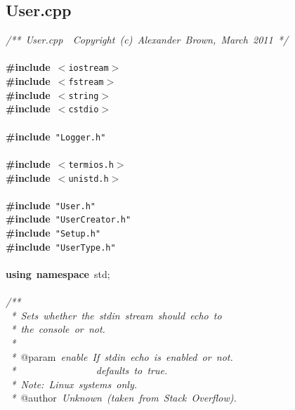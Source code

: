 \clearpage
\normalsize
\rmfamily
\subsection{User.cpp}
\scriptsize
\sffamily
\noindent
\mbox{}\textit{/**\ User.cpp\ \ Copyright\ (c)\ Alexander\ Brown,\ March\ 2011\ */} \\
\mbox{} \\
\mbox{}\textbf{\#include}\ \texttt{$<$iostream$>$} \\
\mbox{}\textbf{\#include}\ \texttt{$<$fstream$>$} \\
\mbox{}\textbf{\#include}\ \texttt{$<$string$>$} \\
\mbox{}\textbf{\#include}\ \texttt{$<$cstdio$>$} \\
\mbox{} \\
\mbox{}\textbf{\#include}\ \texttt{"{}Logger.h"{}} \\
\mbox{} \\
\mbox{}\textbf{\#include}\ \texttt{$<$termios.h$>$} \\
\mbox{}\textbf{\#include}\ \texttt{$<$unistd.h$>$} \\
\mbox{} \\
\mbox{}\textbf{\#include}\ \texttt{"{}User.h"{}} \\
\mbox{}\textbf{\#include}\ \texttt{"{}UserCreator.h"{}} \\
\mbox{}\textbf{\#include}\ \texttt{"{}Setup.h"{}} \\
\mbox{}\textbf{\#include}\ \texttt{"{}UserType.h"{}} \\
\mbox{} \\
\mbox{}\textbf{using}\ \textbf{namespace}\ std; \\
\mbox{} \\
\mbox{}\textit{/**} \\
\mbox{}\textit{\ *\ Sets\ whether\ the\ stdin\ stream\ should\ echo\ to} \\
\mbox{}\textit{\ *\ the\ console\ or\ not.} \\
\mbox{}\textit{\ *} \\
\mbox{}\textit{\ *\ }@param\textit{\ enable\ If\ stdin\ echo\ is\ enabled\ or\ not.} \\
\mbox{}\textit{\ *\ \ \ \ \ \ \ \ \ \ \ \ \ \ \ \ defaults\ to\ true.} \\
\mbox{}\textit{\ *\ Note:\ Linux\ systems\ only.} \\
\mbox{}\textit{\ *\ }@author\textit{\ Unknown\ (taken\ from\ Stack\ Overflow).} \\
